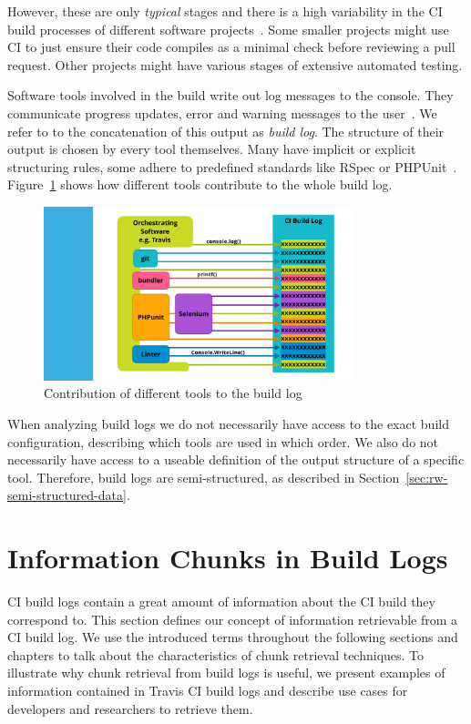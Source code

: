 \documentclass[\myrootdir/main.tex]{subfiles}
\begin{document}
However, these are only \emph{typical} stages and there is a high variability in the CI build processes of different software projects~\cite{staahl2014modeling}.
Some smaller projects might use CI to just ensure their code compiles as a minimal check before reviewing a pull request.
Other projects might have various stages of extensive automated testing.

Software tools involved in the build write out log messages to the console.
They communicate progress updates, error and warning messages to the user~\cite{yuan2012characterizing}.
We refer to to the concatenation of this output as \emph{build log}.
The structure of their output is chosen by every tool themselves.
Many have implicit or explicit structuring rules, some adhere to predefined standards like RSpec or PHPUnit~\cite{phpunit2019logging,rspec2019format}.
Figure~\ref{fig:tool-log-contribution} shows how different tools contribute to the whole build log.

\begin{figure}[htbp]
	\centering
	\includegraphics[page=1, width=0.8\textwidth, trim={5cm 0.5cm 0.5cm 0.5cm}, clip]{img/overview-graphics.pdf}
	\caption{Contribution of different tools to the build log}
	\label{fig:tool-log-contribution}
\end{figure}

When analyzing build logs we do not necessarily have access to the exact build configuration, describing which tools are used in which order.
We also do not necessarily have access to a useable definition of the output structure of a specific tool.
Therefore, build logs are semi-structured, as described in Section~\ref{sec:rw-semi-structured-data}.


\section{Information Chunks in Build Logs}
\label{sec:bli}
CI build logs contain a great amount of information about the CI build they correspond to.
This section defines our concept of information retrievable from a CI build log.
We use the introduced terms throughout the following sections and chapters to talk about the characteristics of chunk retrieval techniques.
To illustrate why chunk retrieval from build logs is useful, we present examples of information contained in Travis CI build logs and describe use cases for developers and researchers to retrieve them.
\end{document}
